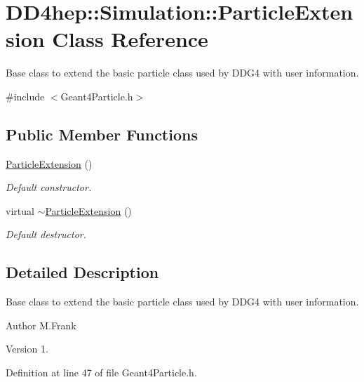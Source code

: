 \hypertarget{class_d_d4hep_1_1_simulation_1_1_particle_extension}{}\section{D\+D4hep\+:\+:Simulation\+:\+:Particle\+Extension Class Reference}
\label{class_d_d4hep_1_1_simulation_1_1_particle_extension}


Base class to extend the basic particle class used by D\+D\+G4 with user information.  




{\ttfamily \#include $<$Geant4\+Particle.\+h$>$}

\subsection*{Public Member Functions}
\begin{DoxyCompactItemize}
\item 
\hyperlink{class_d_d4hep_1_1_simulation_1_1_particle_extension_a6bd53f39e129dedd6a17a7e60c0c03af}{Particle\+Extension} ()
\begin{DoxyCompactList}\small\item\em Default constructor. \end{DoxyCompactList}\item 
virtual \hyperlink{class_d_d4hep_1_1_simulation_1_1_particle_extension_aed2fb52f3a28221b701ab44dee8ed576}{$\sim$\+Particle\+Extension} ()
\begin{DoxyCompactList}\small\item\em Default destructor. \end{DoxyCompactList}\end{DoxyCompactItemize}


\subsection{Detailed Description}
Base class to extend the basic particle class used by D\+D\+G4 with user information. 

\begin{DoxyAuthor}{Author}
M.\+Frank 
\end{DoxyAuthor}
\begin{DoxyVersion}{Version}
1. 
\end{DoxyVersion}


Definition at line 47 of file Geant4\+Particle.\+h.



